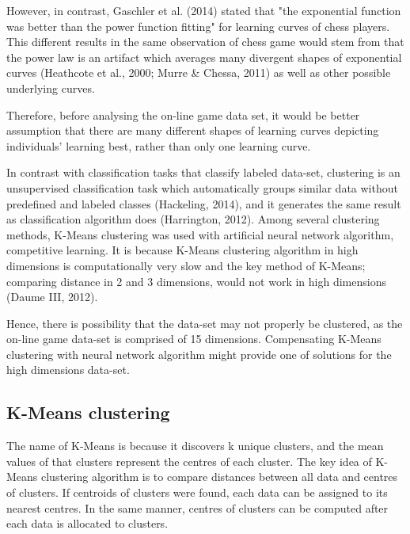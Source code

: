 \documentclass[12pt,a4paper]{report}
\begin{document}
However, in contrast, Gaschler et al. (2014) stated that "the exponential function was better than the power function fitting" for learning curves of chess players. This different results in the same observation of chess game would stem from that the power law is an artifact which averages many divergent shapes of exponential curves (Heathcote et al., 2000; Murre \& Chessa, 2011) as well as other possible underlying curves. 

Therefore, before analysing the on-line game data set, it would be better assumption that there are many different shapes of learning curves depicting individuals' learning best, rather than only one learning curve. 

\bigskip
In contrast with classification tasks that classify labeled data-set, clustering is an unsupervised classification task which automatically groups similar data without predefined and labeled classes (Hackeling, 2014), and it generates the same result as classification algorithm does (Harrington, 2012). 
Among several clustering methods, K-Means clustering was used with artificial neural network algorithm, competitive learning.
It is because K-Means clustering algorithm in high dimensions is computationally very slow and the key method of K-Means; comparing distance in 2 and 3 dimensions, would not work in high dimensions (Daume III, 2012). 

Hence, there is possibility that the data-set may not properly be clustered, as the on-line game data-set is comprised of 15 dimensions. Compensating K-Means clustering with neural network algorithm might provide one of solutions for the high dimensions data-set.

\subsection{K-Means clustering}
The name of K-Means is because it discovers k unique clusters, and the mean values of that clusters represent the centres of each cluster. The key idea of K-Means clustering algorithm is to compare distances between all data and centres of clusters. If centroids of clusters were found, each data can be assigned to its nearest centres. In the same manner, centres of clusters can be computed after each data is allocated to clusters.
\end{document}
